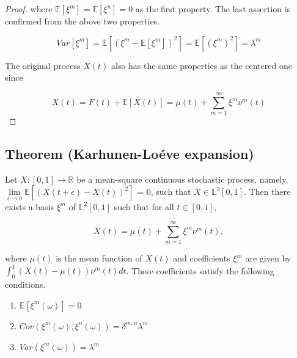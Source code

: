 \documentclass[11pt,twoside,a4paper]{article}
\begin{document}
\begin{proof}
		where $\mathbb{E}[\xi^m] = \mathbb{E}[\xi^n] = 0$ as the first property.
		The last assertion is confirmed from the above two properties.
		
		\begin{equation}\label{Lemma3}
			Var[\xi^m] = \mathbb{E}\left[(\xi^m - \mathbb{E}[\xi^m])^{2}\right] = \mathbb{E}[(\xi^m)^{2}] =\lambda^m
		\end{equation}
	
		The original process $X(t)$ also has the same properties as the centered one since
		
		\begin{equation}
			X(t) = F(t) + \mathbb{E}[X(t)] = \mu(t) + \sum_{m=1}^{\infty}\xi^m\nu^m(t)
		\end{equation}
	
	\end{proof}
	
	
	\subsection{Theorem (Karhunen-Lo\'{e}ve expansion)} \label{Proof2}
	
	Let $X : [0,1]  \rightarrow \mathbb{R}$ be a mean-square continuous stochastic process, namely, $\lim\limits_{\epsilon \rightarrow 0} \mathbb{E}[(X(t+\epsilon) - X(t))^2]$ = 0, such that $X \in \mathbb{L}^{2}[0,1]$. Then there exists a basis ${\xi^m}$ of $\mathbb{L}^2[0,1]$ such that for all $t \in [0,1]$,
	
	\begin{equation}
		X(t) = \mu(t) + \sum_{m=1}^{\infty} \xi^m \nu^m(t),
	\end{equation}

	where $\mu(t)$ is the mean function of $X(t)$ and coefficients $\xi^m$ are given by $\int_{0}^{1} (X(t) - \mu(t)) \nu^m(t)dt$. These coefficients satisfy the following conditions.
	
	\begin{multicols}{2}
		\begin{enumerate}
			\item $\mathbb{E}\left[\xi^m(\omega)\right] = 0$
			\item $Cov\left(\xi^m(\omega), \xi^n(\omega)\right) = \delta^{m,n}\lambda^m$ %
			\item $Var\left(\xi^m(\omega)\right) = \lambda^m$
		\end{enumerate}
	\end{multicols}
\end{document}
